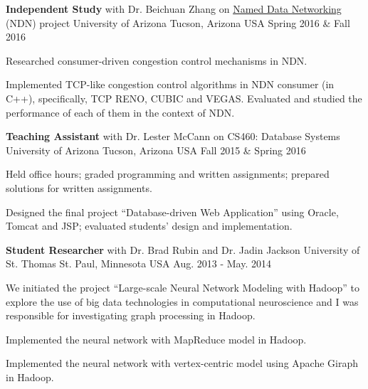 \begin{cventries}
  \cventry
    {\textbf{Independent Study} with Dr. Beichuan Zhang
    on \href{https://named-data.net/}{Named Data Networking} (NDN) project} %
    {University of Arizona} %
    {Tucson, Arizona USA} %
    {Spring 2016 \& Fall 2016} %
    {
      \begin{cvitems} %
        \item {Researched consumer-driven congestion control mechanisms in
    NDN.}
        \item {Implemented TCP-like congestion control algorithms in NDN
    consumer (in C++), specifically, TCP RENO, CUBIC and VEGAS.
    Evaluated and studied the performance of each of them in the
    context of NDN.}
      \end{cvitems}
    }


  \cventry
    {\textbf{Teaching Assistant} with Dr. Lester McCann
    on CS460: Database Systems}
    {University of Arizona} %
    {Tucson, Arizona USA} %
    {Fall 2015 \& Spring 2016} %
    {
      \begin{cvitems} %
        \item {Held office hours; graded programming and written
    assignments; prepared solutions for written assignments.}
        \item {Designed the final project ``Database-driven Web
    Application'' using Oracle, Tomcat and JSP; evaluated
    students' design and implementation.}
      \end{cvitems}
    }

  \cventry
    {\textbf{Student Researcher} with Dr. Brad Rubin and Dr. Jadin Jackson}
    {University of St. Thomas} %
    {St. Paul, Minnesota USA} %
    {Aug. 2013 - May. 2014} %
    {
      \begin{cvitems} %
        \item {We initiated the project ``Large-scale Neural Network
    Modeling with Hadoop'' to explore the use of big data technologies in
    computational neuroscience and I was responsible for investigating 
    graph processing in Hadoop.}
        \item {Implemented the neural network with MapReduce model in
    Hadoop.}
        \item {Implemented the neural network with vertex-centric model
    using Apache Giraph in Hadoop.}
      \end{cvitems}
    }

\end{cventries}
